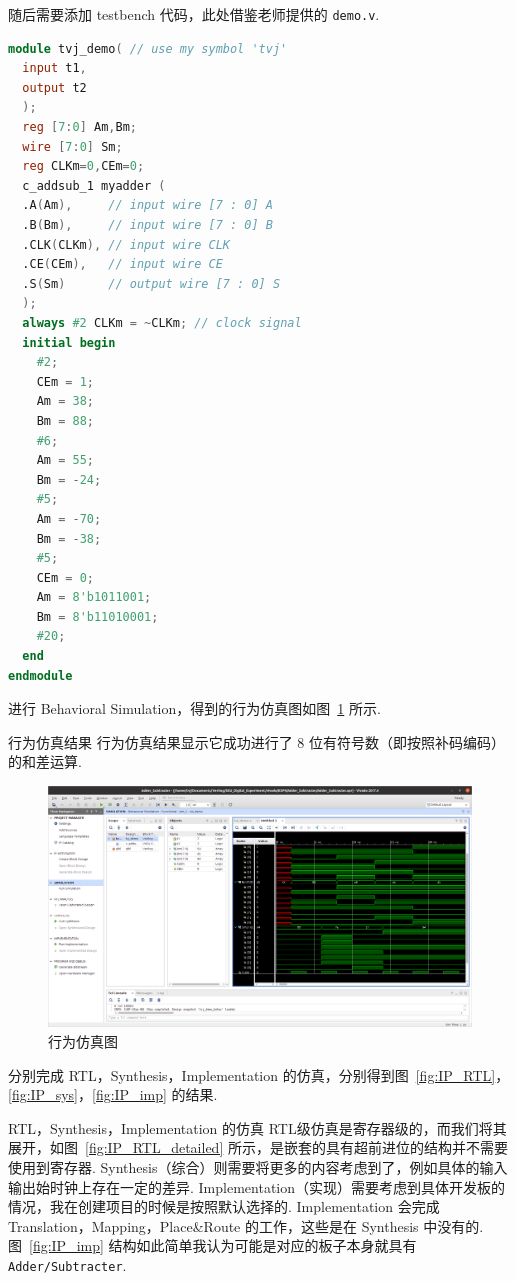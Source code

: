 \documentclass[11pt]{SEU-Digital-Report}
\begin{document}
        随后需要添加 testbench 代码，此处借鉴老师提供的 \texttt{demo.v}\cite{guide}.

        \begin{lstlisting}[language=verilog]
module tvj_demo( // use my symbol 'tvj'
  input t1, 
  output t2 
  ); 
  reg [7:0] Am,Bm; 
  wire [7:0] Sm; 
  reg CLKm=0,CEm=0; 
  c_addsub_1 myadder ( 
  .A(Am),     // input wire [7 : 0] A
  .B(Bm),     // input wire [7 : 0] B
  .CLK(CLKm), // input wire CLK
  .CE(CEm),   // input wire CE
  .S(Sm)      // output wire [7 : 0] S
  );
  always #2 CLKm = ~CLKm; // clock signal
  initial begin
    #2;
    CEm = 1;
    Am = 38;
    Bm = 88;
    #6; 
    Am = 55;
    Bm = -24;
    #5;
    Am = -70;
    Bm = -38;
    #5;
    CEm = 0;
    Am = 8'b1011001;
    Bm = 8'b11010001;
    #20;
  end
endmodule
        \end{lstlisting}

        进行 Behavioral Simulation，得到的行为仿真图如图~\ref{fig:IP_simu} 所示.
        \begin{analyze}{行为仿真结果}{}
          行为仿真结果显示它成功进行了 8 位有符号数（即按照补码编码）的和差运算.
        \end{analyze}

        \begin{figure}[htbp]
          \centering
          \includegraphics[width=\linewidth]{fig/IP_simu.png}
          \caption{行为仿真图}
          \label{fig:IP_simu}
        \end{figure}

        分别完成 RTL，Synthesis，Implementation 的仿真，分别得到图~\ref{fig:IP_RTL}，\ref{fig:IP_sys}，\ref{fig:IP_imp} 的结果.
        \begin{analyze}{RTL，Synthesis，Implementation 的仿真}{}
          RTL级仿真是寄存器级的，而我们将其展开，如图~\ref{fig:IP_RTL_detailed} 所示，是嵌套的具有超前进位的结构并不需要使用到寄存器.
          Synthesis（综合）则需要将更多的内容考虑到了，例如具体的输入输出始时钟上存在一定的差异.
          Implementation（实现）需要考虑到具体开发板的情况，我在创建项目的时候是按照默认选择的. Implementation 会完成 Translation，Mapping，Place\&Route 的工作，这些是在 Synthesis 中没有的.
          图~\ref{fig:IP_imp} 结构如此简单我认为可能是对应的板子本身就具有 \texttt{Adder/Subtracter}.
        \end{analyze}        
\end{document}

